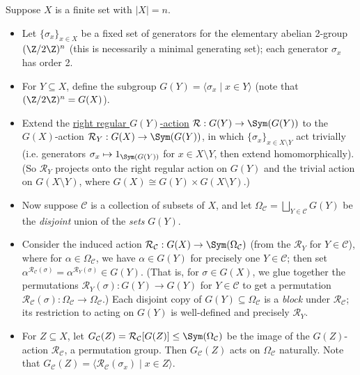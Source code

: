 \begin{example}\label{eg:blaha_elem_technical_construction}
    Suppose $X$ is a finite set with $|X| = n$.
    \begin{itemize}
        \item Let $\{\sigma_x\}_{x \in X}$ be a fixed set of generators for the elementary abelian 2-group $(\Z/2\Z)^n$ (this is necessarily a minimal generating set); each generator $\sigma_x$ has order 2.
        \item For $Y \subseteq X$, define the subgroup $G(Y) = \langle \sigma_x \mid x \in Y \rangle$ (note that $(\Z/2\Z)^n = G(X)$).
        \item Extend the \hyperref[eg:right_regular_action]{right regular $G(Y)$-action} $\mathcal{R} : G(Y) \to \Sym(G(Y))$ to the $G(X)$-action $\mathcal{R}_Y : G(X) \to \Sym(G(Y))$, in which $\{\sigma_x\}_{x \in X \setminus Y}$ act trivially (i.e. generators $\sigma_x \mapsto 1_{\Sym(G(Y))}$ for $x \in X \setminus Y$, then extend homomorphically). (So $\mathcal{R}_Y$ projects onto the right regular action on $G(Y)$ and the trivial action on $G(X \setminus Y)$, where $G(X) \cong G(Y) \times G(X \setminus Y)$.)
        \item Now suppose $\mathcal{C}$ is a collection of subsets of $X$, and let $\Omega_\mathcal{C} = \bigsqcup_{Y \in \mathcal{C}} G(Y)$ be the \textit{disjoint} union of the \textit{sets} $G(Y)$.
        \item Consider the induced action $\mathcal{R}_\mathcal{C} : G(X) \to \Sym(\Omega_\mathcal{C})$ (from the $\mathcal{R}_Y$ for $Y \in \mathcal{C}$), where for $\alpha \in \Omega_\mathcal{C}$, we have $\alpha \in G(Y)$ for precisely one $Y \in \mathcal{C}$; then set $\alpha^{\mathcal{R}_\mathcal{C}(\sigma)} = \alpha^{\mathcal{R}_Y(\sigma)} \in G(Y)$. (That is, for $\sigma \in G(X)$, we glue together the permutations $\mathcal{R}_Y(\sigma) : G(Y) \to G(Y)$ for $Y \in \mathcal{C}$ to get a permutation $\mathcal{R}_\mathcal{C}(\sigma) : \Omega_\mathcal{C} \to \Omega_\mathcal{C}$.) Each disjoint copy of $G(Y) \subseteq \Omega_\mathcal{C}$ is a \textit{block} under $\mathcal{R}_\mathcal{C}$; its restriction to acting on $G(Y)$ is well-defined and precisely $\mathcal{R}_Y$.
        \item For $Z \subseteq X$, let $G_\mathcal{C}(Z) = \mathcal{R}_\mathcal{C}[G(Z)] \leq \Sym(\Omega_\mathcal{C})$ be the image of the $G(Z)$-action $\mathcal{R}_\mathcal{C}$, a permutation group. Then $G_\mathcal{C}(Z)$ acts on $\Omega_\mathcal{C}$ naturally. Note that $G_\mathcal{C}(Z) = \langle \mathcal{R}_\mathcal{C}(\sigma_x) \mid x \in Z \rangle$.
    \end{itemize}
\end{example}

